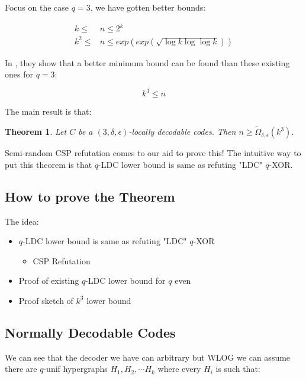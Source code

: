 \documentclass{article}
\newtheorem{theorem}{Theorem}
\begin{document}
\noindent Focus on the case $q=3$, we have gotten better bounds:

\begin{equation}
\begin{split}
k \leq & n \leq 2^k \\
k^2 \leq & n \leq exp(exp(\sqrt{\log k \log \log k}))
\end{split}
\end{equation}

\noindent In \cite{Alrabiah2022-ds}, they show that a better minimum bound can be found than these existing ones for $q=3$:

\begin{equation}
k^3 \leq n
\end{equation}

\noindent The main result is that:

\begin{theorem}
Let $C$ be a $(3, \delta, \epsilon)$-locally decodable codes. Then $n \geq \tilde{\Omega}_{\delta, \epsilon}(k^3)$.
\end{theorem}

\noindent Semi-random CSP refutation comes to our aid to prove this! The intuitive way to put this theorem is that $q$-LDC lower bound is same as refuting "LDC" $q$-XOR.

\subsection{How to prove the Theorem}

The idea:

\begin{itemize}
    \item $q$-LDC lower bound is same as refuting "LDC" $q$-XOR \label{proofp1}
        \begin{itemize}
            \item CSP Refutation
        \end{itemize}
    \item Proof of existing $q$-LDC lower bound for $q$ even
    \item Proof sketch of $k^3$ lower bound
\end{itemize}

\subsection{Normally Decodable Codes}

We can see that the decoder we have can arbitrary but WLOG we can assume there are $q$-unif hypergraphs ${H_1, H_2, \cdots H_k}$ where every $H_i$ is such that:
\end{document}
